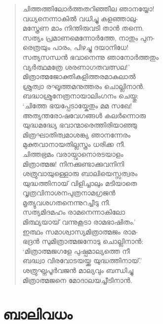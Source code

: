 \begin{verse}
ചിത്തത്തിലോര്‍ത്തതറിഞ്ഞീല ഞാനയ്യോ!\\
വധ്യനെന്നാകില്‍ വധിച്ചു കളഞ്ഞാലു-\\
മസ്ത്രേണ മാം നിന്തിരുവടി താന്‍ തന്നെ.\\
സത്യം പ്രമാണമെന്നോര്‍ത്തേ, നാതും പുന-\\
രെത്രയും പാരം, പിഴച്ചു ദയാനിധേ!\\
സത്യസന്ധന്‍ ഭവാനെന്നു ഞാനോര്‍ത്തതും\\
വ്യര്‍ത്ഥമത്രേ ശരണാഗതവത്സല!’\\
മിത്രാത്മജോക്തികളിത്തരമാകുലാല്‍\\
ശ്രുത്വാ രഘൂത്തമനുത്തരം ചൊല്ലിനാന്‍.\\
ബദ്ധാശ്രുനേത്രനായാലിംഗനം ചെയ്തു:\\
‘ചിത്തേ ഭയപ്പേടായ്കേതും മമ സഖേ!\\
അത്യന്തരോഷവേഗങ്ങള്‍ കലര്‍ന്നൊരു\\
യുദ്ധമദ്ധ്യേ ഭവാന്മാരെത്തിരിയാഞ്ഞു\\
മിത്രഘാതിത്വമാശങ്ക്യ ഞാനന്നേരം\\
മുക്തവാനായതില്ലസ്ത്രം ധരിക്ക നീ.\\
ചിത്തഭ്രമം വരായ്വാനൊരടയാളം\\
മിത്രാത്മജ! നിനക്കുണ്ടാക്കുവനിനി\\
ശത്രുവായുള്ളൊരു ബാലിയെസ്സത്വരം\\
യുദ്ധത്തിനായ് വിളിച്ചാലും മടിയാതെ\\
വൃത്രവിനാശനപുത്രനാമഗ്രജന്‍\\
മൃത്യുവശഗതനെന്നുറച്ചീടു നീ.\\
സത്യമിദമഹം രാമനെന്നാകിലോ\\
മിത്ഥ്യയായ് വന്നുകൂടാ രാമഭാഷിതം.’\\
ഇത്ഥം സമാശ്വാസ്യമിത്രാത്മജം രാമ-\\
ഭദ്രന്‍ സുമിത്രാത്മജനോടു ചൊല്ലിനാന്‍:\\
‘മിത്രാത്മജഗളേ പുഷ്പമാല്യത്തെ നീ\\
ബദ്ധ്വാ വിരവോടയയ്ക്ക യുദ്ധത്തിനായ്.’\\
ശത്രുഘ്നപൂര്‍വജന്‍ മാല്യവും ബന്ധിച്ചു\\
മിത്രാത്മജനെ മോദാലയച്ചീടിനാന്‍.
\end{verse}


\section{ബാലിവധം}

